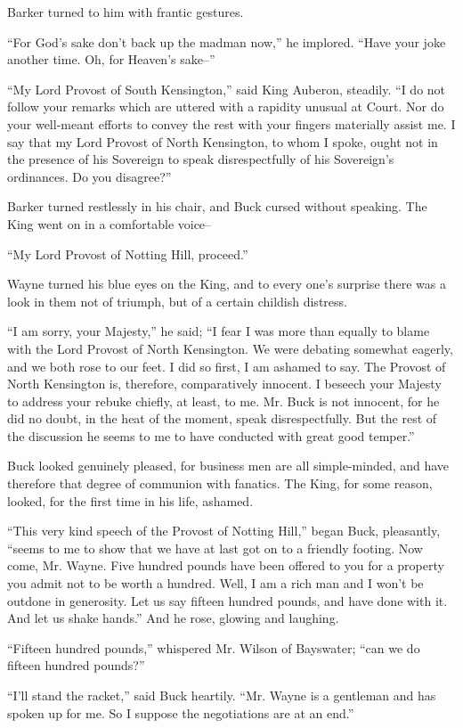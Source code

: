 \documentclass{book}
\begin{document}
Barker turned to him with frantic gestures.

“For God’s sake don’t back up the madman now,” he implored. “Have your joke another time. Oh, for Heaven’s sake–”

“My Lord Provost of South Kensington,” said King Auberon, steadily. “I do not follow your remarks which are uttered with a rapidity unusual at Court. Nor do your well-meant efforts to convey the rest with your fingers materially assist me. I say that my Lord Provost of North Kensington, to whom I spoke, ought not in the presence of his Sovereign to speak disrespectfully of his Sovereign’s ordinances. Do you disagree?”

Barker turned restlessly in his chair, and Buck cursed without speaking. The King went on in a comfortable voice–

“My Lord Provost of Notting Hill, proceed.”

Wayne turned his blue eyes on the King, and to every one’s surprise there was a look in them not of triumph, but of a certain childish distress.

“I am sorry, your Majesty,” he said; “I fear I was more than equally to blame with the Lord Provost of North Kensington. We were debating somewhat eagerly, and we both rose to our feet. I did so first, I am ashamed to say. The Provost of North Kensington is, therefore, comparatively innocent. I beseech your Majesty to address your rebuke chiefly, at least, to me. Mr. Buck is not innocent, for he did no doubt, in the heat of the moment, speak disrespectfully. But the rest of the discussion he seems to me to have conducted with great good temper.”

Buck looked genuinely pleased, for business men are all simple-minded, and have therefore that degree of communion with fanatics. The King, for some reason, looked, for the first time in his life, ashamed.

“This very kind speech of the Provost of Notting Hill,” began Buck, pleasantly, “seems to me to show that we have at last got on to a friendly footing. Now come, Mr. Wayne. Five hundred pounds have been offered to you for a property you admit not to be worth a hundred. Well, I am a rich man and I won’t be outdone in generosity. Let us say fifteen hundred pounds, and have done with it. And let us shake hands.” And he rose, glowing and laughing.

“Fifteen hundred pounds,” whispered Mr. Wilson of Bayswater; “can we do fifteen hundred pounds?”

“I’ll stand the racket,” said Buck heartily. “Mr. Wayne is a gentleman and has spoken up for me. So I suppose the negotiations are at an end.”
\end{document}

